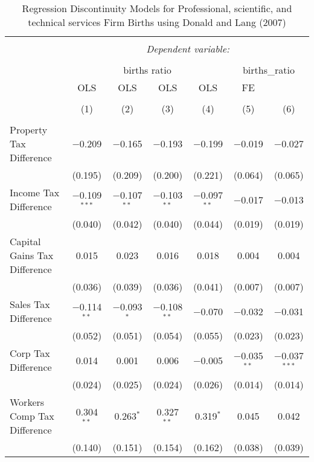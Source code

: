 
\begin{table}[!htbp] \centering 
  \caption{Regression Discontinuity Models for  Professional, scientific, and technical services Firm Births using Donald and Lang (2007)} 
  \label{} 
\begin{tabular}{@{\extracolsep{5pt}}lcccccc} 
\\[-1.8ex]\hline 
\hline \\[-1.8ex] 
 & \multicolumn{6}{c}{\textit{Dependent variable:}} \\ 
\cline{2-7} 
\\[-1.8ex] & \multicolumn{4}{c}{births ratio} & \multicolumn{2}{c}{births\_ratio} \\ 
 & OLS & OLS & OLS & OLS & FE &  \\ 
\\[-1.8ex] & (1) & (2) & (3) & (4) & (5) & (6)\\ 
\hline \\[-1.8ex] 
 Property Tax Difference & $-$0.209 & $-$0.165 & $-$0.193 & $-$0.199 & $-$0.019 & $-$0.027 \\ 
  & (0.195) & (0.209) & (0.200) & (0.221) & (0.064) & (0.065) \\ 
  Income Tax Difference & $-$0.109$^{***}$ & $-$0.107$^{**}$ & $-$0.103$^{**}$ & $-$0.097$^{**}$ & $-$0.017 & $-$0.013 \\ 
  & (0.040) & (0.042) & (0.040) & (0.044) & (0.019) & (0.019) \\ 
  Capital Gains Tax Difference & 0.015 & 0.023 & 0.016 & 0.018 & 0.004 & 0.004 \\ 
  & (0.036) & (0.039) & (0.036) & (0.041) & (0.007) & (0.007) \\ 
  Sales Tax Difference & $-$0.114$^{**}$ & $-$0.093$^{*}$ & $-$0.108$^{**}$ & $-$0.070 & $-$0.032 & $-$0.031 \\ 
  & (0.052) & (0.051) & (0.054) & (0.055) & (0.023) & (0.023) \\ 
  Corp Tax Difference & 0.014 & 0.001 & 0.006 & $-$0.005 & $-$0.035$^{**}$ & $-$0.037$^{***}$ \\ 
  & (0.024) & (0.025) & (0.024) & (0.026) & (0.014) & (0.014) \\ 
  Workers Comp Tax Difference & 0.304$^{**}$ & 0.263$^{*}$ & 0.327$^{**}$ & 0.319$^{*}$ & 0.045 & 0.042 \\ 
  & (0.140) & (0.151) & (0.154) & (0.162) & (0.038) & (0.039) \\ 

\end{tabular}
\end{table}
